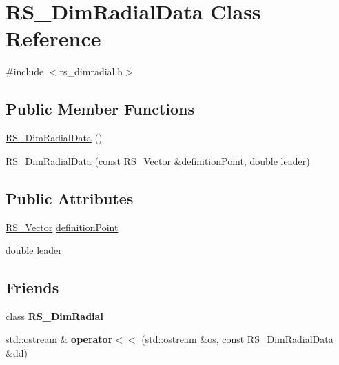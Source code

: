 \hypertarget{classRS__DimRadialData}{\section{R\-S\-\_\-\-Dim\-Radial\-Data Class Reference}
\label{classRS__DimRadialData}
}


{\ttfamily \#include $<$rs\-\_\-dimradial.\-h$>$}

\subsection*{Public Member Functions}
\begin{DoxyCompactItemize}
\item 
\hyperlink{classRS__DimRadialData_a185e862a8552472911713930890bd17c}{R\-S\-\_\-\-Dim\-Radial\-Data} ()
\item 
\hyperlink{classRS__DimRadialData_a0b86ec79fa19a1a5e84fb048239ad2a4}{R\-S\-\_\-\-Dim\-Radial\-Data} (const \hyperlink{classRS__Vector}{R\-S\-\_\-\-Vector} \&\hyperlink{classRS__DimRadialData_aeac3a16cfcdc676e7cc644f8412ffe3d}{definition\-Point}, double \hyperlink{classRS__DimRadialData_abdc0c64e6901c22c4788100b0485e020}{leader})
\end{DoxyCompactItemize}
\subsection*{Public Attributes}
\begin{DoxyCompactItemize}
\item 
\hyperlink{classRS__Vector}{R\-S\-\_\-\-Vector} \hyperlink{classRS__DimRadialData_aeac3a16cfcdc676e7cc644f8412ffe3d}{definition\-Point}
\item 
double \hyperlink{classRS__DimRadialData_abdc0c64e6901c22c4788100b0485e020}{leader}
\end{DoxyCompactItemize}
\subsection*{Friends}
\begin{DoxyCompactItemize}
\item 
\hypertarget{classRS__DimRadialData_a28c4110cf6beebe18d4cc63a71196ee0}{class {\bfseries R\-S\-\_\-\-Dim\-Radial}}\label{classRS__DimRadialData_a28c4110cf6beebe18d4cc63a71196ee0}

\item 
\hypertarget{classRS__DimRadialData_a195ef4ec02203e8e5b4d9661f91ed9d2}{std\-::ostream \& {\bfseries operator$<$$<$} (std\-::ostream \&os, const \hyperlink{classRS__DimRadialData}{R\-S\-\_\-\-Dim\-Radial\-Data} \&dd)}\label{classRS__DimRadialData_a195ef4ec02203e8e5b4d9661f91ed9d2}

\end{DoxyCompactItemize}


